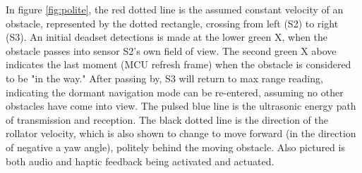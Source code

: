 \noindent In figure \ref{fig:polite}, the red dotted line is the assumed constant velocity of an obstacle, represented by the dotted rectangle, crossing from left (S2) to right (S3). An initial deadset detections is made at the lower green X, when the obstacle passes into sensor S2's own field of view. The second green X above indicates the last moment (MCU refresh frame) when the obstacle is considered to be "in the way." After passing by, S3 will return to max range reading, indicating the dormant navigation mode can be re-entered, assuming no other obstacles have come into view. The pulsed blue line is the ultrasonic energy path of transmission and reception. The black dotted line is the direction of the rollator velocity, which is also shown to change to move forward (in the direction of negative a yaw angle), politely behind the moving obstacle. Also pictured is both audio and haptic feedback being activated and actuated.\\